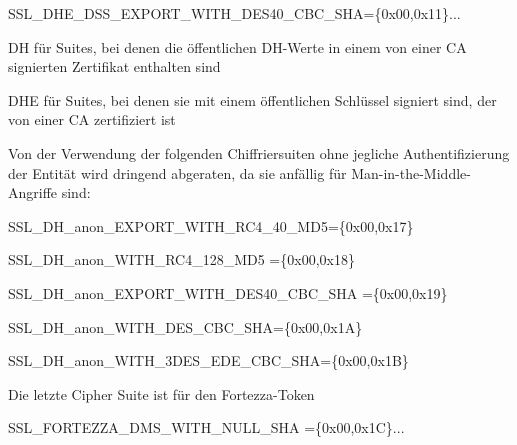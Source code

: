 \documentclass[a4paper]{article}
\begin{document}
\begin{multicols}{3}
\begin{itemize*}
\begin{itemize*}
                  \item SSL\_DHE\_DSS\_EXPORT\_WITH\_DES40\_CBC\_SHA=\{0x00,0x11\}...
                  \item DH für Suites, bei denen die öffentlichen DH-Werte in einem von einer CA signierten Zertifikat enthalten sind
                  \item DHE für Suites, bei denen sie mit einem öffentlichen Schlüssel signiert sind, der von einer CA zertifiziert ist
            \end{itemize*}
      \end{itemize*}
      \begin{itemize*}
            \item Von der Verwendung der folgenden Chiffriersuiten ohne jegliche Authentifizierung der Entität wird dringend abgeraten, da sie anfällig für Man-in-the-Middle-Angriffe sind:
            \begin{itemize*}
                  \item SSL\_DH\_anon\_EXPORT\_WITH\_RC4\_40\_MD5=\{0x00,0x17\}
                  \item SSL\_DH\_anon\_WITH\_RC4\_128\_MD5 =\{0x00,0x18\}
                  \item SSL\_DH\_anon\_EXPORT\_WITH\_DES40\_CBC\_SHA =\{0x00,0x19\}
                  \item SSL\_DH\_anon\_WITH\_DES\_CBC\_SHA=\{0x00,0x1A\}
                  \item SSL\_DH\_anon\_WITH\_3DES\_EDE\_CBC\_SHA=\{0x00,0x1B\}
            \end{itemize*}
            \item Die letzte Cipher Suite ist für den Fortezza-Token
            \begin{itemize*}
                  \item SSL\_FORTEZZA\_DMS\_WITH\_NULL\_SHA =\{0x00,0x1C\}...
            \end{itemize*}
      \end{itemize*}


\end{multicols}
\end{document}
